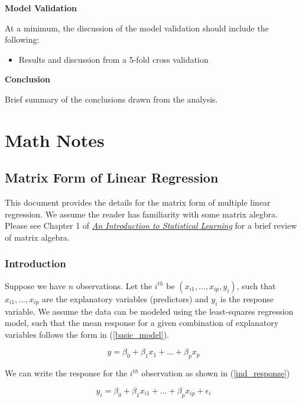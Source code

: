 \documentclass[]{book}
\providecommand{\tightlist}{%
  \setlength{\itemsep}{0pt}\setlength{\parskip}{0pt}}
\begin{document}
\textbf{Model Validation}

At a minimum, the discussion of the model validation should include the
following:

\begin{itemize}
\tightlist
\item
  Results and discussion from a 5-fold cross validation
\end{itemize}

\textbf{Conclusion}

Brief summary of the conclusions drawn from the analysis.

\part{Math Notes}\label{part-math-notes}

\chapter{Matrix Form of Linear
Regression}\label{matrix-form-of-linear-regression}

This document provides the details for the matrix form of multiple
linear regression. We assume the reader has familiarity with some matrix
alegbra. Please see Chapter 1 of
\href{https://www-bcf.usc.edu/~gareth/ISL/}{\emph{An Introduction to
Statistical Learning}} for a brief review of matrix algebra.

\section{Introduction}\label{introduction-1}

Suppose we have \(n\) observations. Let the \(i^{th}\) be
\((x_{i1}, \ldots, x_{ip}, y_i)\), such that \(x_{i1}, \ldots, x_{ip}\)
are the explanatory variables (predictors) and \(y_i\) is the response
variable. We assume the data can be modeled using the least-squares
regression model, such that the mean response for a given combination of
explanatory variables follows the form in (\ref{basic_model}).

\begin{equation}
\label{basic_model}
y = \beta_0 + \beta_1 x_1 + \dots + \beta_p x_p 
\end{equation}

We can write the response for the \(i^{th}\) observation as shown in
(\ref{ind_response})

\begin{equation}
\label{ind_response}
y_i = \beta_0 + \beta_1 x_{i1} + \dots + \beta_p x_{ip} + \epsilon_i 
\end{equation}
\end{document}
